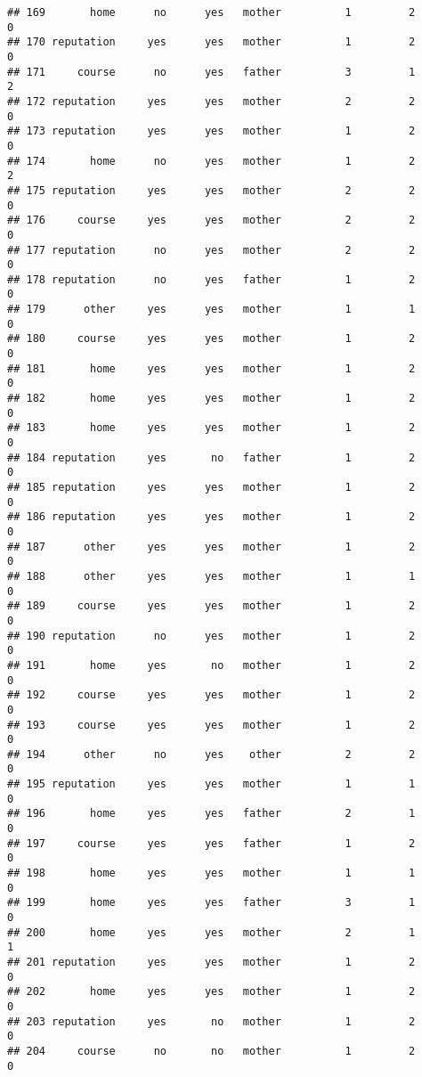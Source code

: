 \documentclass[]{article}
\begin{document}
\begin{verbatim}
## 169       home      no      yes   mother          1         2        0
## 170 reputation     yes      yes   mother          1         2        0
## 171     course      no      yes   father          3         1        2
## 172 reputation     yes      yes   mother          2         2        0
## 173 reputation     yes      yes   mother          1         2        0
## 174       home      no      yes   mother          1         2        2
## 175 reputation     yes      yes   mother          2         2        0
## 176     course     yes      yes   mother          2         2        0
## 177 reputation      no      yes   mother          2         2        0
## 178 reputation      no      yes   father          1         2        0
## 179      other     yes      yes   mother          1         1        0
## 180     course     yes      yes   mother          1         2        0
## 181       home     yes      yes   mother          1         2        0
## 182       home     yes      yes   mother          1         2        0
## 183       home     yes      yes   mother          1         2        0
## 184 reputation     yes       no   father          1         2        0
## 185 reputation     yes      yes   mother          1         2        0
## 186 reputation     yes      yes   mother          1         2        0
## 187      other     yes      yes   mother          1         2        0
## 188      other     yes      yes   mother          1         1        0
## 189     course     yes      yes   mother          1         2        0
## 190 reputation      no      yes   mother          1         2        0
## 191       home     yes       no   mother          1         2        0
## 192     course     yes      yes   mother          1         2        0
## 193     course     yes      yes   mother          1         2        0
## 194      other      no      yes    other          2         2        0
## 195 reputation     yes      yes   mother          1         1        0
## 196       home     yes      yes   father          2         1        0
## 197     course     yes      yes   father          1         2        0
## 198       home     yes      yes   mother          1         1        0
## 199       home     yes      yes   father          3         1        0
## 200       home     yes      yes   mother          2         1        1
## 201 reputation     yes      yes   mother          1         2        0
## 202       home     yes      yes   mother          1         2        0
## 203 reputation     yes       no   mother          1         2        0
## 204     course      no       no   mother          1         2        0

\end{verbatim}
\end{document}
